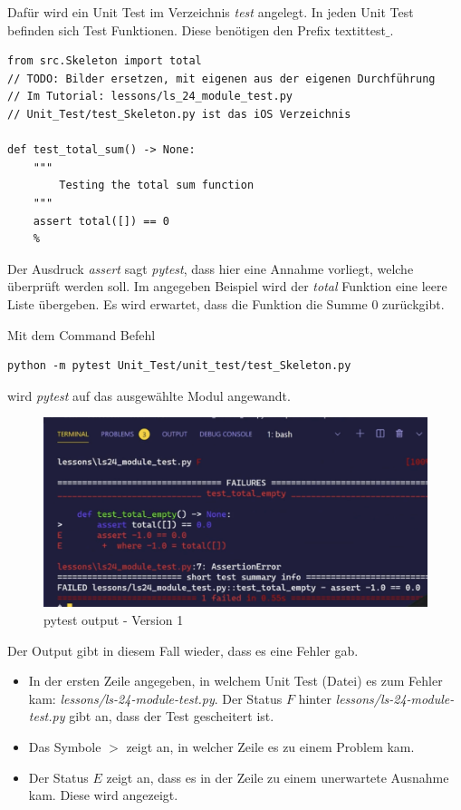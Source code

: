 Dafür wird ein Unit Test im Verzeichnis \textit{test} angelegt. In jeden Unit Test befinden sich Test Funktionen. Diese benötigen den Prefix textit{test}$\_$.

\begin{lstlisting}[style=python, caption={Unit Test - Version 1; Skeleton-test.py}, captionpos=b]
from src.Skeleton import total
// TODO: Bilder ersetzen, mit eigenen aus der eigenen Durchführung
// Im Tutorial: lessons/ls_24_module_test.py
// Unit_Test/test_Skeleton.py ist das iOS Verzeichnis

def test_total_sum() -> None:
    """
        Testing the total sum function
    """
	assert total([]) == 0
	%
\end{lstlisting}

Der Ausdruck \textit{assert} sagt \textit{pytest}, dass hier eine Annahme vorliegt, welche überprüft werden soll. Im angegeben Beispiel wird der \textit{total} Funktion eine leere Liste übergeben. Es wird erwartet, dass die Funktion die Summe 0 zurückgibt.

Mit dem Command Befehl

\begin{lstlisting}[style=CMD, caption={Unit Test - Version 1; Skeleton-test.py}, captionpos=b]
python -m pytest Unit_Test/unit_test/test_Skeleton.py
\end{lstlisting}

wird \textit{pytest} auf das ausgewählte Modul angewandt.

\begin{figure}[H]
	\centering
	\includegraphics[scale = 0.6]{attachment/chapter_2/Scc085}
	\caption{pytest output - Version 1}
\end{figure}

Der Output gibt in diesem Fall wieder, dass es eine Fehler gab. 
\begin{itemize}
	\item In der ersten Zeile angegeben, in welchem Unit Test (Datei) es zum Fehler kam: \textit{lessons/ls-24-module-test.py}. Der Status $F$ hinter \textit{lessons/ls-24-module-test.py} gibt an, dass der Test gescheitert ist.
	\item Das Symbole $>$ zeigt an, in welcher Zeile es zu einem Problem kam. 
	\item Der Status $E$ zeigt an, dass es in der Zeile zu einem unerwartete Ausnahme kam. Diese wird angezeigt.
\end{itemize}

